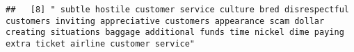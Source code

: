 \documentclass[
]{article}
\begin{document}
\begin{verbatim}
##   [8] " subtle hostile customer service culture bred disrespectful customers inviting appreciative customers appearance scam dollar creating situations baggage additional funds time nickel dime paying extra ticket airline customer service"                                                                                                                                                                                                                                                                                                                                                                                                                                                                                                                                                                                                                                                                                                                                                                                                                                                                                                                                                                                                                                                                                                                                                                                                                                                                                                                                                                                                                                                                                                                                                       

\end{verbatim}
\end{document}
